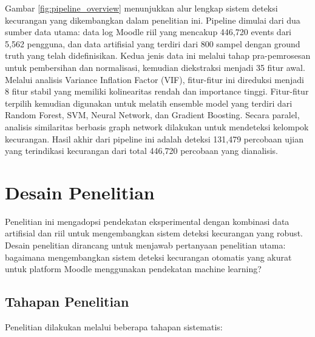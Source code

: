Gambar \ref{fig:pipeline_overview} menunjukkan alur lengkap sistem deteksi kecurangan yang dikembangkan dalam penelitian ini. Pipeline dimulai dari dua sumber data utama: data log Moodle riil yang mencakup 446,720 events dari 5,562 pengguna, dan data artifisial yang terdiri dari 800 sampel dengan ground truth yang telah didefinisikan. Kedua jenis data ini melalui tahap pra-pemrosesan untuk pembersihan dan normalisasi, kemudian diekstraksi menjadi 35 fitur awal. Melalui analisis Variance Inflation Factor (VIF), fitur-fitur ini direduksi menjadi 8 fitur stabil yang memiliki kolinearitas rendah dan importance tinggi. Fitur-fitur terpilih kemudian digunakan untuk melatih ensemble model yang terdiri dari Random Forest, SVM, Neural Network, dan Gradient Boosting. Secara paralel, analisis similaritas berbasis graph network dilakukan untuk mendeteksi kelompok kecurangan. Hasil akhir dari pipeline ini adalah deteksi 131,479 percobaan ujian yang terindikasi kecurangan dari total 446,720 percobaan yang dianalisis.

\section{Desain Penelitian}
\label{sec:desainPenelitian}
Penelitian ini mengadopsi pendekatan eksperimental dengan kombinasi data artifisial dan riil untuk mengembangkan sistem deteksi kecurangan yang robust. Desain penelitian dirancang untuk menjawab pertanyaan penelitian utama: bagaimana mengembangkan sistem deteksi kecurangan otomatis yang akurat untuk platform Moodle menggunakan pendekatan machine learning?

\subsection{Tahapan Penelitian}
Penelitian dilakukan melalui beberapa tahapan sistematis:

